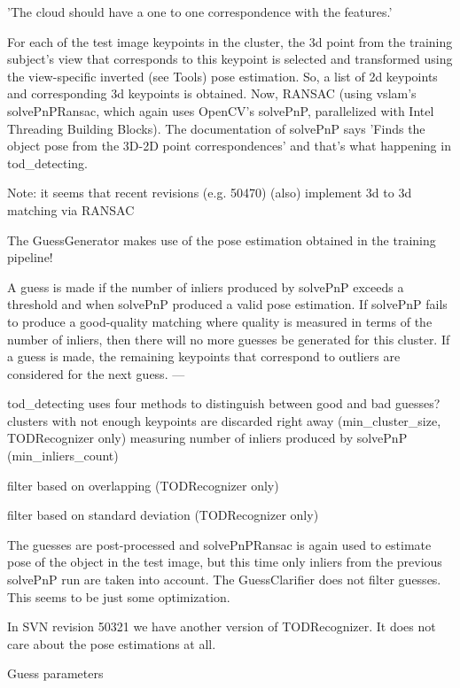 {'The cloud should have a one to one correspondence with the features.'

For each of the test image keypoints in the cluster, the 3d point from the
training subject's view that corresponds to this keypoint is selected and
transformed using the view-specific inverted (see Tools) pose estimation. So, a
list of 2d keypoints and corresponding 3d keypoints is obtained. Now, RANSAC
(using vslam's solvePnPRansac, which again uses OpenCV's solvePnP, parallelized
with Intel Threading Building Blocks). The documentation of solvePnP says
'Finds the object pose from the 3D-2D point correspondences' and that's what
happening in tod\_detecting.

Note: it seems that recent revisions (e.g. 50470) (also) implement 3d to 3d
matching via RANSAC

The GuessGenerator makes use of the pose estimation obtained in the training
pipeline!

A guess is made if the number of inliers produced by solvePnP exceeds a
threshold and when solvePnP produced a valid pose estimation. If solvePnP fails
to produce a good-quality matching where quality is measured in terms of the
number of inliers, then there will no more guesses be generated for this
cluster. If a guess is made, the remaining keypoints that correspond to
outliers are considered for the next guess.  ---

tod\_detecting uses four methods to distinguish between good and bad guesses?
clusters with not enough keypoints are discarded right away
(min\_cluster\_size, TODRecognizer only) measuring number of inliers produced
by solvePnP (min\_inliers\_count)

filter based on overlapping (TODRecognizer only)

filter based on standard deviation (TODRecognizer only)

The guesses are post-processed and solvePnPRansac is again used to estimate
pose of the object in the test image, but this time only inliers from the
previous solvePnP run are taken into account. The GuessClarifier does not
filter guesses. This seems to be just some optimization.

In SVN revision 50321 we have another version of TODRecognizer. It does not
care about the pose estimations at all.
}

Guess parameters

